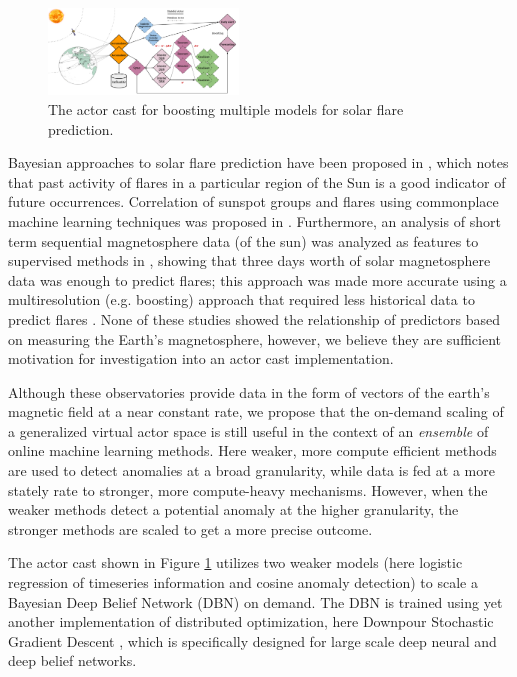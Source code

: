 \documentclass[conference,twocolumn,10pt]{IEEEtran}
\begin{document}
\begin{figure}[!t]
    \centering
    \includegraphics[width=0.45\textwidth]{solar_cast}
    \caption{The actor cast for boosting multiple models for solar flare prediction.}
    \label{fig:solar_cast}
\end{figure}

Bayesian approaches to solar flare prediction have been proposed in \cite{wheatland_bayesian_2004}, which notes that past activity of flares in a particular region of the Sun is a good indicator of future occurrences. Correlation of sunspot groups and flares using commonplace machine learning techniques was proposed in \cite{qahwaji_automatic_2007}. Furthermore, an analysis of short term sequential magnetosphere data (of the sun) was analyzed as features to supervised methods in \cite{yu_short-term_2009}, showing that three days worth of solar magnetosphere data was enough to predict flares; this approach was made more accurate using a multiresolution (e.g. boosting) approach that required less historical data to predict flares \cite{yu_short-term_2010}. None of these studies showed the relationship of predictors based on measuring the Earth's magnetosphere, however, we believe they are sufficient motivation for investigation into an actor cast implementation.

Although these observatories provide data in the form of vectors of the earth's magnetic field at a near constant rate, we propose that the on-demand scaling of a generalized virtual actor space is still useful in the context of an \textit{ensemble} of online machine learning methods. Here weaker, more compute efficient methods are used to detect anomalies at a broad granularity, while data is fed at a more stately rate to stronger, more compute-heavy mechanisms. However, when the weaker methods detect a potential anomaly at the higher granularity, the stronger methods are scaled to get a more precise outcome.

The actor cast shown in Figure \ref{fig:solar_cast} utilizes two weaker models (here logistic regression of timeseries information and cosine anomaly detection) to scale a Bayesian Deep Belief Network (DBN) on demand. The DBN is trained using yet another implementation of distributed optimization, here Downpour Stochastic Gradient Descent \cite{dean_large_2012}, which is specifically designed for large scale deep neural and deep belief networks.
\end{document}

